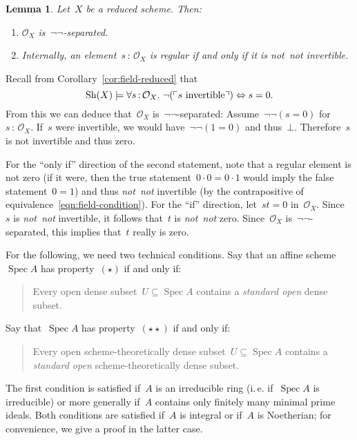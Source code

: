\documentclass[10pt,reqno,a4paper]{amsbook}
\makeatletter
\theoremstyle{definition}
\theoremstyle{plain}
\newtheorem{lemma}[defn]{Lemma}
\theoremstyle{remark}
\renewcommand{\O}{\mathcal{O}}
\newcommand{\Sh}{\mathrm{Sh}}
\DeclareMathOperator{\Spec}{Spec}
\newcommand{\?}{\,{:}\,}
\renewcommand{\_}{\mathpunct{.}\,}
\newcommand{\speak}[1]{\ulcorner\text{\textnormal{#1}}\urcorner}
\newcommand{\ie}{i.\,e.\@\xspace}
\newcommand{\notnot}{\emph{not~not}\xspace}
\renewenvironment{proof}[1][\proofname]{\par
  \pushQED{\qed}%
  \normalfont \topsep6\p@\@plus6\p@\relax
  \trivlist
  \item[\hskip\labelsep
        \itshape
    #1\@addpunct{.}]\ignorespaces
}{%
  \popQED\endtrivlist\@endpefalse
}
\makeatother
\begin{document}
\begin{lemma}\label{lemma:regular-notnot-invertible}Let~$X$ be a reduced scheme. Then:
\begin{enumerate}
\item $\O_X$ is~$\neg\neg$-separated.
\item Internally, an element~$s\?\O_X$ is regular
if and only if it is \notnot invertible.
\end{enumerate}
\end{lemma}
\begin{proof}Recall from Corollary~\ref{cor:field-reduced} that
\begin{equation}\label{eqn:field-condition}
  \Sh(X) \models \forall s\?\O_X\_ \neg(\speak{$s$ invertible}) \Leftrightarrow
  s=0.
\end{equation}
From this we can deduce that~$\O_X$ is~$\neg\neg$-separated:
Assume~$\neg\neg(s=0)$ for~$s\?\O_X$. If~$s$ were invertible, we would
have~$\neg\neg(1=0)$ and thus~$\bot$. Therefore~$s$ is not invertible and thus
zero.

For the ``only if'' direction of the second statement,
note that a regular element is not zero (if it were, then the true statement~$0
\cdot 0 = 0 \cdot 1$ would imply the false statement~$0 = 1$) and thus \notnot
invertible (by the contrapositive of equivalence~\eqref{eqn:field-condition}). For the ``if''
direction, let~$st = 0$ in~$\O_X$. Since~$s$ is \notnot invertible, it follows
that~$t$ is \notnot zero. Since~$\O_X$ is~$\neg\neg$-separated, this implies
that~$t$ really is zero.
\end{proof}

For the following, we need two technical conditions. Say that an affine
scheme~$\Spec A$ has property~$(\star)$ if and only if:
\begin{quote}
Every open dense subset~$U \subseteq \Spec A$ contains a
\emph{standard open} dense subset.
\end{quote}
Say that~$\Spec A$ has property~$(\star\star)$ if and only if:
\begin{quote}
Every open scheme-theoretically dense subset~$U \subseteq \Spec A$ contains a
\emph{standard open} scheme-theoretically dense subset.
\end{quote}
The first condition is satisfied if~$A$ is an irreducible ring (\ie if~$\Spec A$
is irreducible) or more generally if~$A$ contains only finitely many minimal
prime ideals. Both conditions are satisfied if~$A$ is integral or if~$A$ is
Noetherian; for convenience, we give a proof in the
latter case.
\end{document}
